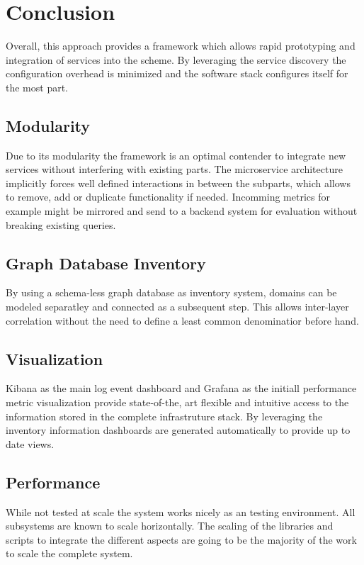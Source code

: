 \section{Conclusion}
Overall, this approach provides a framework which allows rapid prototyping and integration of services into the scheme.
By leveraging the service discovery the configuration overhead is minimized and the software stack configures itself for the most part.

\subsection{Modularity}
Due to its modularity the framework is an optimal contender to integrate new services without interfering with existing parts.
The microservice architecture implicitly forces well defined interactions in between the subparts, which allows to remove, add or duplicate functionality if needed.
Incomming metrics for example might be mirrored and send to a backend system for evaluation without breaking existing queries.

\subsection{Graph Database Inventory}
By using a schema-less graph database as inventory system, domains can be modeled separatley and connected as a subsequent step. This allows inter-layer
correlation without the need to define a least common denominatior before hand.

\subsection{Visualization}
Kibana as the main log event dashboard and Grafana as the initiall performance metric visualization provide state-of-the, art flexible and intuitive
access to the information stored in the complete infrastruture stack. By leveraging the inventory information dashboards are generated automatically to
provide up to date views.

\subsection{Performance}
While not tested at scale the system works nicely as an testing environment. All subsystems are known to scale horizontally.
The scaling of the libraries and scripts to integrate the different aspects are going to be the majority of the work to scale the complete system.
